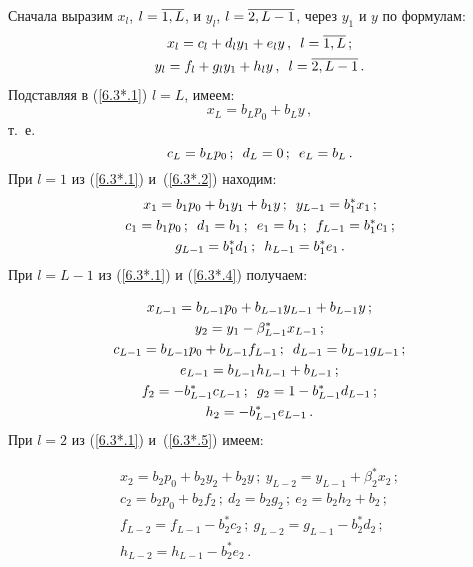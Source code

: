 \begin{multicols}{2}
Сначала выразим $x_l$, $l\hm=\overline{1,L}$, и
$y_l$,  $l\hm=\overline{2,L-1}$, через $y_1$ и $y$ по формулам:
\begin{gather*}
x_{l} = c_l + d_l y_1 + e_l y \,,\enskip l=\overline{1,L}\,;
\\
y_{l} = f_l + g_l y_1 + h_l y \,,\enskip l=\overline{2,L-1}\,.
\end{gather*}
Подставляя в (\ref{6.3*.1}) $l=L$, имеем:
\begin{equation*}
x_{L} = b_L p_0 + b_L y \,,
\end{equation*}
т.\ е.
\begin{equation*}
c_{L} = b_L p_0\,;
\enskip d_{L} = 0\,;
\enskip
e_L= b_L \,.
\end{equation*}
При $l=1$ из (\ref{6.3*.1}) и~(\ref{6.3*.2}) находим:
\begin{gather*}
x_{1} = b_{1} p_0 + b_{1} y_1 + b_{1} y\,;
\enskip 
y_{L-1}= b^*_{1} x_{1} \,;
\\
c_{1} = b_{1} p_0\,; \enskip d_{1}=b_{1}\,;
\enskip 
e_{1} =b_{1}\,;\enskip
f_{L-1}=b^*_{1} c_{1} \,;
\\
g_{L-1}=b^*_{1} d_{1}\,;
\enskip
h_{L-1}= b^*_{1} e_{1}\,.
\end{gather*}
При $l=L-1$ из (\ref{6.3*.1}) и (\ref{6.3*.4}) получаем:

\noindent
\begin{gather*}
x_{L-1} = b_{L-1} p_0 + b_{L-1} y_{L-1} + b_{L-1} y\,;
\\
y_{2}= y_{1} - \beta^*_{L-1} x_{L-1}\,;
\\
c_{L-1} = b_{L-1} p_0 + b_{L-1} f_{L-1} \,;
\enskip
d_{L-1} = b_{L-1} g_{L-1}\,;
\\
e_{L-1}=b_{L-1} h_{L-1} + b_{L-1}\,;
\\
f_{2} = - b^*_{L-1} c_{L-1}\,;
\enskip
g_{2}=1 - b^*_{L-1} d_{L-1}\,;
\\
h_{2}=- b^*_{L-1} e_{L-1}\,.
\end{gather*}
При $l=2$ из (\ref{6.3*.1}) и~(\ref{6.3*.5}) имеем:

\noindent
\begin{gather*}
x_{2} = b_{2} p_0 + b_{2} y_2 + b_{2} y\,;
\
y_{L-2} = y_{L-1} + \beta^*_{2} x_{2} \,;
\\
c_{2} =b_{2} p_0 + b_{2} f_{2} \,;
\ 
d_{2} = b_{2} g_{2}\,;
\
e_{2} = b_{2} h_{2} + b_{2}\,;
\\
f_{L-2} = f_{L-1} - b^*_{2} c_{2}\,;
\ 
g_{L-2} = g_{L-1} - b^*_{2} d_{2}\,;
\\
h_{L-2} = h_{L-1} - b^*_{2} e_{2} \,.
\end{gather*}


\end{multicols}
